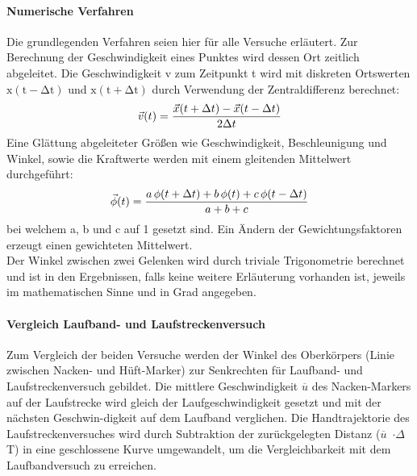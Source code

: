 \paragraph{Numerische Verfahren}
Die grundlegenden Verfahren seien hier für alle Versuche erläutert. Zur Berechnung der Geschwindigkeit eines Punktes wird dessen Ort zeitlich abgeleitet. Die Geschwindigkeit v zum Zeitpunkt t wird mit diskreten Ortswerten $\mathrm{x(t - \Delta{t})}$ und $\mathrm{x(t + \Delta{t})}$ durch Verwendung der Zentraldifferenz berechnet:
\vspace{-5pt}
\begin{equation}
\vec{v}(t) = \frac{\vec{x}(t + \Delta{t}) - \vec{x}(t - \Delta{t})}{2\Delta{t}}
\vspace{-5pt}
\end{equation}
Eine Glättung abgeleiteter Größen wie Geschwindigkeit, Beschleunigung und Winkel, sowie die Kraftwerte werden mit einem gleitenden Mittelwert durchgeführt:
\vspace{-5pt}
\begin{equation}
\vec{\phi}(t) = \frac{a\,\phi(t + \Delta{t}) + b\,\phi(t) + c\,\phi(t - \Delta{t})}{a + b + c}
\vspace{-5pt}
\end{equation}
bei welchem a, b und c auf 1 gesetzt sind. Ein Ändern der Gewichtungsfaktoren erzeugt einen gewichteten Mittelwert.\\
Der Winkel zwischen zwei Gelenken wird durch triviale Trigonometrie berechnet und ist in den Ergebnissen, falls keine weitere Erläuterung vorhanden ist, jeweils im mathematischen Sinne und in Grad angegeben. 
\vspace{-3pt}

\paragraph{Vergleich Laufband- und Laufstreckenversuch}
Zum Vergleich der beiden Versuche werden der Winkel des Oberkörpers (Linie zwischen Nacken- und Hüft-Marker) zur Senkrechten für Laufband- und Laufstreckenversuch gebildet. Die mittlere Geschwindigkeit $\overline{u}$ des Nacken-Markers auf der Laufstrecke wird gleich der Laufgeschwindigkeit gesetzt und mit der nächsten Geschwin-digkeit auf dem Laufband verglichen. Die Handtrajektorie des Laufstreckenversuches wird durch Subtraktion der zurückgelegten Distanz ($\overline{u}$~$\cdot\Delta$T) in eine geschlossene Kurve umgewandelt, um die Vergleichbarkeit mit dem Laufbandversuch zu erreichen.
\vspace{-3pt} 
